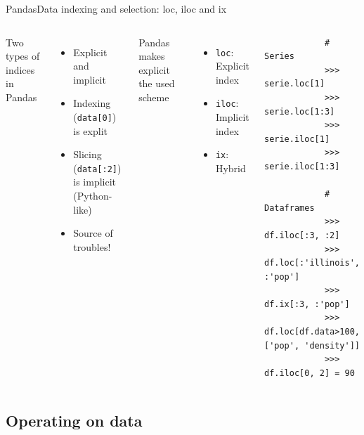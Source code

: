 \documentclass[10pt,compress]{beamer} %
\begin{document}
\begin{frame}[fragile]{Pandas}{Data indexing and selection: loc, iloc and ix}
	\begin{columns}
	Two types of indices in Pandas
	\begin{itemize}
		\item Explicit and implicit
		\item Indexing (\texttt{data[0]}) is explit
		\item Slicing (\texttt{data[:2]}) is implicit (Python-like)
		\item Source of troubles!
	\end{itemize}
	Pandas makes explicit the used scheme
	\begin{itemize}
		\item \texttt{loc}: Explicit index
		\item \texttt{iloc}: Implicit index
		\item \texttt{ix}: Hybrid
	\end{itemize}
		\begin{exampleblock}{}
		\vspace{-0.2cm} 
			\begin{lstlisting}
			# Series
			>>> serie.loc[1]
			>>> serie.loc[1:3]
			>>> serie.iloc[1]
			>>> serie.iloc[1:3]

			# Dataframes
			>>> df.iloc[:3, :2]
			>>> df.loc[:'illinois', :'pop']
			>>> df.ix[:3, :'pop']
			>>> df.loc[df.data>100, ['pop', 'density']]
			>>> df.iloc[0, 2] = 90
			\end{lstlisting}
		\end{exampleblock}
	\end{columns}
\end{frame}

\subsection{Operating on data}
\end{document}
